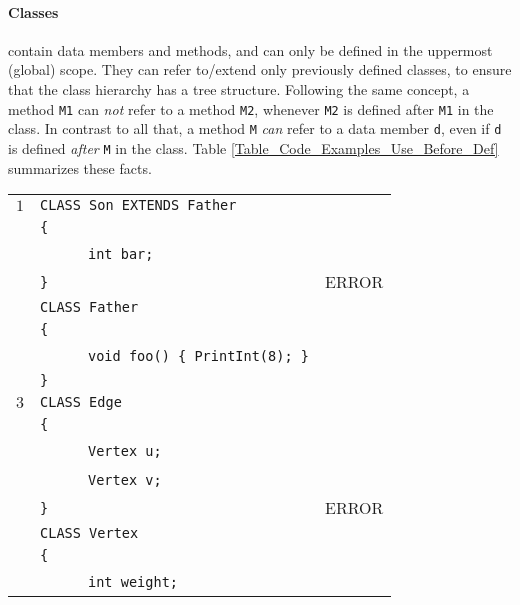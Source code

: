 \documentclass{article}
\begin{document}
\paragraph{Classes} contain data members and methods,
and can only be defined in the uppermost (global) scope.
They can refer to/extend only previously defined classes,
to ensure that the class hierarchy has a tree structure.
Following the same concept,
a method \verb"M1" can \textit{not} refer to a method \verb"M2",
whenever \verb"M2" is defined after \verb"M1" in the class.
In contrast to all that,
a method \verb"M" \textit{can} refer to a data member \verb"d",
even if \verb"d" is defined \textit{after} \verb"M" in the class.
Table \ref{Table_Code_Examples_Use_Before_Def} summarizes these facts.
\begin{table}[h]
\centering
\begin{tabular}{|l|l|l|}
\hline
 $1$ & \verb"CLASS Son EXTENDS Father"           &       \\
     & \verb"{"                                  &       \\
     & ~ ~ ~ ~\verb"int bar;"                    &       \\
     & \verb"}"                                  & ERROR \\
     & \verb"CLASS Father"                       &       \\
     & \verb"{"                                  &       \\
     & ~ ~ ~ ~\verb"void foo() { PrintInt(8); }" &       \\
     & \verb"}"                                  &       \\
\hline
 $3$ & \verb"CLASS Edge"                         &       \\
     & \verb"{"                                  &       \\
     & ~ ~ ~ ~\verb"Vertex u;"                   &       \\
     & ~ ~ ~ ~\verb"Vertex v;"                   &       \\
     & \verb"}"                                  & ERROR \\
     & \verb"CLASS Vertex"                       &       \\
     & \verb"{"                                  &       \\
     & ~ ~ ~ ~\verb"int weight;"                 &       \\

\end{tabular}
\end{table}
\end{document}
